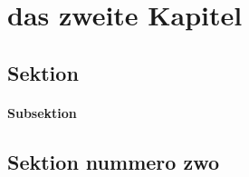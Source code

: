 
\chapter{das zweite Kapitel} %
\label{cha:das_zweite_kapitel}

\blindtext

\section{Sektion} %
\label{sec:sektion}

\blindtext[3]

\subsubsection{Subsektion} %
\label{ssub:subsektion}

\blindtext[3]



\section{Sektion nummero zwo} %
\label{sec:sektion_nummero_zwo}

\blindtext[3]


